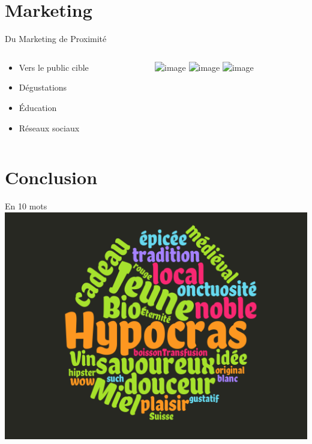 \documentclass[11pt]{beamer}
\begin{document}
\section{Marketing}
\begin{frame}{Du Marketing de Proximité}
  \begin{columns}[T] %
     \begin{column}[T]{5cm} %
     \begin{itemize}[<+->]
     \item Vers le public cible
     \item Dégustations
     \item Éducation
     \item Réseaux sociaux
     \end{itemize}
     \end{column}
     \begin{column}[T]{5cm} %
          \includegraphics<1>[width=\textwidth]{img/banshees_2.jpg}
          \includegraphics<2>[width=\textwidth]{img/conv.jpg}
          \includegraphics<3->[width=\textwidth]{img/flyer.jpg}
     \end{column}
   \end{columns}
\end{frame}
\section{Conclusion}
\begin{frame}{En 10 mots}
\includegraphics[width=\textwidth]{img/wordcloud_round.png}
\end{frame}
\end{document}
